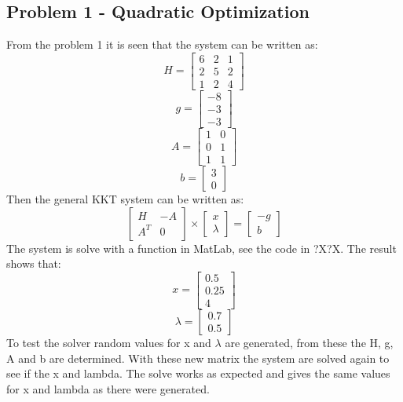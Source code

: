 \subsection{Problem 1 - Quadratic Optimization}
From the problem 1 it is seen that the system can be written as:
\[H=\begin{bmatrix}
	6 & 2 & 1 \\2 & 5 & 2 \\1 & 2 & 4
\end{bmatrix}\]
\[g=\begin{bmatrix}
	-8 \\-3 \\ -3
\end{bmatrix}\]
\[A=\begin{bmatrix}
	1 & 0 \\ 0 & 1 \\ 1 & 1
\end{bmatrix}\]
\[b= \begin{bmatrix}
	3 \\ 0
\end{bmatrix}\]
Then the general KKT system can be written as:
\[\begin{bmatrix}
	H & -A \\A^T & 0
\end{bmatrix} \times \begin{bmatrix}
	x\\ \lambda
\end{bmatrix} =\begin{bmatrix}
	-g\\ b
\end{bmatrix}\]
The system is solve with a function in MatLab, see the code in ?X?X. The result shows that:
\[x=\begin{bmatrix}
	0.5 \\ 0.25 \\ 4
\end{bmatrix}\]
\[\lambda=\begin{bmatrix}
	0.7 \\0.5 
\end{bmatrix}\]
To test the solver random values for x and $\lambda$ are generated, from these the H, g, A and b are determined. With these new matrix the system are solved again to see if the x and lambda. The solve works as expected and gives the same values for x and lambda as there were generated.

